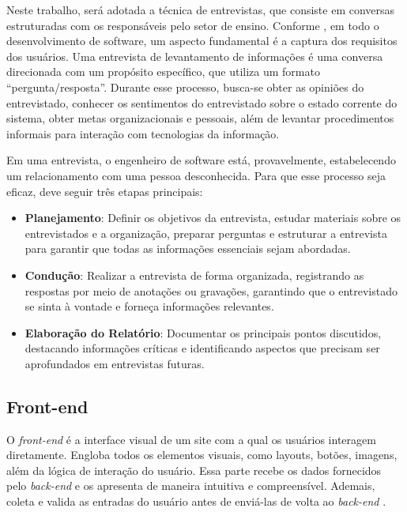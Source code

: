 Neste trabalho, será adotada a técnica de entrevistas, que consiste em conversas estruturadas com os responsáveis pelo setor de ensino. Conforme , em todo o desenvolvimento de software, um aspecto fundamental é a captura dos requisitos dos usuários. Uma entrevista de levantamento de informações é uma conversa direcionada com um propósito específico, que utiliza um formato ``pergunta/resposta''. Durante esse processo, busca-se obter as opiniões do entrevistado, conhecer os sentimentos do entrevistado sobre o estado corrente do sistema, obter metas organizacionais e pessoais, além de levantar procedimentos informais para interação com tecnologias da informação.

Em uma entrevista, o engenheiro de software está, provavelmente, estabelecendo um relacionamento com uma pessoa desconhecida. Para que esse processo seja eficaz, deve seguir três etapas principais:

\begin{itemize}
    \item \textbf{Planejamento}: Definir os objetivos da entrevista, estudar materiais sobre os entrevistados e a organização, preparar perguntas e estruturar a entrevista para garantir que todas as informações essenciais sejam abordadas.
    \item \textbf{Condução}: Realizar a entrevista de forma organizada, registrando as respostas por meio de anotações ou gravações, garantindo que o entrevistado se sinta à vontade e forneça informações relevantes.
    \item \textbf{Elaboração do Relatório}: Documentar os principais pontos discutidos, destacando informações críticas e identificando aspectos que precisam ser aprofundados em entrevistas futuras.
\end{itemize}

\subsection{Front-end}

O \textit{front-end} é a interface visual de um site com a qual os usuários interagem diretamente. Engloba todos os elementos visuais, como layouts, botões, imagens, além da lógica de interação do usuário. Essa parte recebe os dados fornecidos pelo \textit{back-end} e os apresenta de maneira intuitiva e compreensível. Ademais, coleta e valida as entradas do usuário antes de enviá-las de volta ao \textit{back-end} \cite{garcia2024plataforma}.


